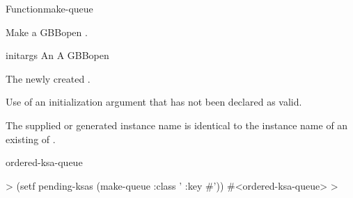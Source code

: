 \documentclass[10pt,twoside,english,pdftex]{article}
\begin{document}
\begin{functiondoc}{Function}{make-queue}{ 
    \returns{} }
%
%
%

\fnsyntax

\fnpurpose Make a GBBopen .

\fnpackage {}

\fnmodule {}

\fnargs
\begin{args}{initargs}
\arg[initargs] An 
\arg[queue] A GBBopen 
\end{args}

\fnreturns The newly created .
  
\fnerrors
Use of an initialization argument that has not been declared as valid.

The supplied or generated instance name is identical to the instance name of
an existing  of .

\begin{alsos}{ordered-ksa-queue}
\also[queue]
\end{alsos}

\fnexample
{}%
%
%
\W\supp
\begin{example}
  > (setf pending-ksas (make-queue :class '
                                   :key #'))
  #<ordered-ksa-queue>
  >
\end{example}

\end{functiondoc}

\end{document}
